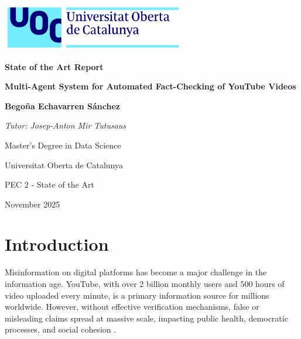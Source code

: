 \documentclass[12pt,a4paper]{article}
\begin{document}
\begin{titlepage}
    \begin{center}
    \vspace*{0.5cm}

    \includegraphics[width=0.6\textwidth]{../../assets/uoc_logo.png}

    \vspace{1.5cm}

    {\Huge \textbf{State of the Art Report}}

    \vspace{2cm}

    {\LARGE \textbf{Multi-Agent System for Automated Fact-Checking of YouTube Videos}}

    \vspace{2.5cm}

    \textbf{\large Begoña Echavarren Sánchez}

    \vspace{0.5cm}

    \textit{Tutor: Josep-Anton Mir Tutusaus}

    \vspace{2cm}

    {\large Master's Degree in Data Science}

    {\large Universitat Oberta de Catalunya}

    \vspace{1cm}

    {\large PEC 2 - State of the Art}

    \vspace{0.5cm}

    {\large November 2025}

    \end{center}
\end{titlepage}

\newpage
{}

\hypersetup{linkcolor=black}
\tableofcontents
\hypersetup{linkcolor=blue}

\newpage

\section{Introduction}

Misinformation on digital platforms has become a major challenge in the information age. YouTube, with over 2 billion monthly users and 500 hours of video uploaded every minute, is a primary information source for millions worldwide. However, without effective verification mechanisms, false or misleading claims spread at massive scale, impacting public health, democratic processes, and social cohesion \citep{aly2021feverous, benkler2018network, wardle2017information}.
\end{document}

